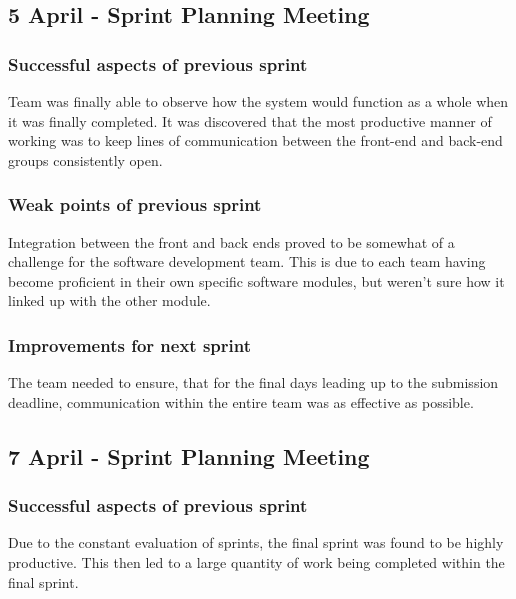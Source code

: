 \documentclass[journal,comsoc,onecolumn]{IEEEtran}
\begin{document}

\subsection{5 April - Sprint Planning Meeting}

\subsubsection{Successful aspects of previous sprint}
\hfill \break Team was finally able to observe how the system would function as a whole when it was finally completed.
It was discovered that the most productive manner of working was to keep lines of communication between the front-end and back-end groups consistently open.

\subsubsection{Weak points of previous sprint}
\hfill \break Integration between the front and back ends proved to be somewhat of a challenge for the software development team. This is due to each team having become proficient in their own specific software modules, but weren't sure how it linked up with the other module.

\subsubsection{Improvements for next sprint}
\hfill \break The team needed to ensure, that for the final days leading up to the submission deadline, communication within the entire team was as effective as possible.


\subsection{7 April - Sprint Planning Meeting}

\subsubsection{Successful aspects of previous sprint}
\hfill \break Due to the constant evaluation of sprints, the final sprint was found to be highly productive. This then led to a large quantity of work being completed within the final sprint.
\end{document}

